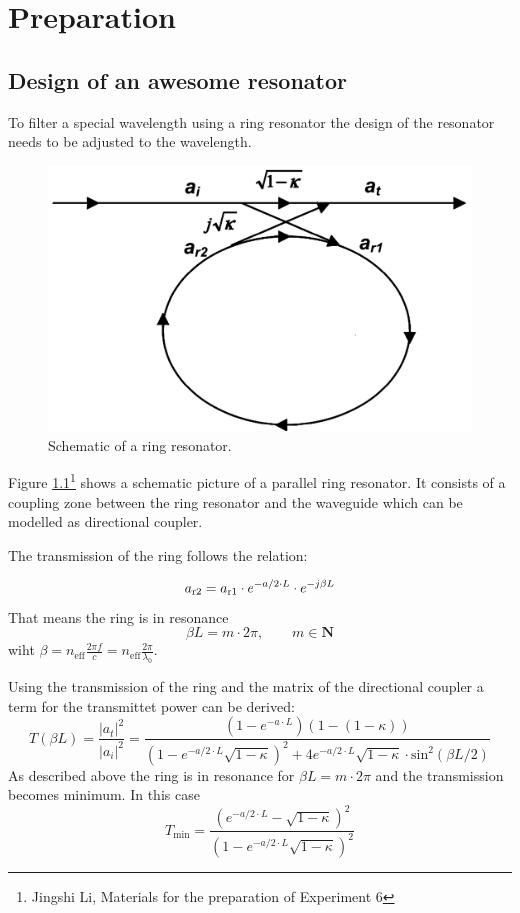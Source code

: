 \chapter{Preparation}


\section{Design of an awesome resonator}
To filter a special wavelength using a ring resonator the design of the resonator needs to be adjusted to the wavelength.
\begin{figure}[h]%
\centering
\includegraphics[width=.5\columnwidth]{Grafiken/Resonator.png}%
\caption{Schematic of a ring resonator.}%
\label{fig:p1_ring}%
\end{figure} 
Figure \ref{fig:p1_ring}\footnote[1]{Jingshi Li, Materials for the preparation of Experiment 6} shows a schematic picture of a parallel ring resonator. It consists of a coupling zone between the ring resonator and the waveguide which can be modelled as directional coupler\footnotemark[1].

The transmission of the ring follows the relation:

\begin{equation}
a_{\mathrm{r2}}=a_{\mathrm{r1}}\cdot e^{-a/2\cdot L}\cdot e^{-j\beta L}
\label{eq:}
\end{equation}
That means the ring is in resonance
\begin{equation}
\beta L = m\cdot2\pi,\qquad m \in \mathbf{N}
\label{eq:}
\end{equation}
wiht $\beta = n_{\mathrm{eff}} \frac{2\pi f}{c} = n_{\mathrm{eff}} \frac{2\pi}{\lambda_0}$.

Using the transmission of the ring and the matrix of the directional coupler a term for the transmittet power can be derived\footnotemark[1]:
\begin{equation}
T(\beta L) = \frac{|a_t|^2}{|a_i|^2}= \frac{(1-e^{-a\cdot L})(1-(1-\kappa))}{(1-e^{-a/2\cdot L}\sqrt{1-\kappa})^2+4e^{-a/2\cdot L}\sqrt{1-\kappa}\cdot\mathrm{sin}^2(\beta L / 2)}
\label{eq:}
\end{equation}
As described above the ring is in resonance for $\beta L = m\cdot2\pi$ and the transmission becomes minimum. 
In this case
\begin{equation}
T_{\mathrm{min}}=\frac{(e^{-a/2\cdot L} - \sqrt{1-\kappa})^2}{(1 - e^{-a/2\cdot L}\sqrt{1-\kappa})^2}
\label{eq:}
\end{equation}

